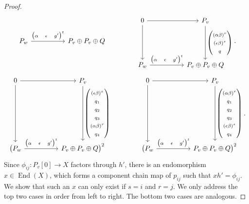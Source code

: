 \documentclass[11pt]{amsart}
\DeclareMathOperator{\End}{\mathrm{End}}
\theoremstyle{definition}
\begin{document}
\begin{proof}
\[\begin{tikzcd}[ampersand replacement=\&, column sep=50, row sep = 50]
	P_w \arrow[r, "{\begin{pmatrix} \alpha & \epsilon & g' \end{pmatrix}}^t"] \& P_v \oplus P_v \oplus Q 
	\end{tikzcd}
	\qquad  \qquad
	\begin{tikzcd}[ampersand replacement=\&, column sep=50, row sep = 50]
	0 \arrow[r, ] \arrow[d] \& P_v \arrow[d, "\begin{pmatrix} (\alpha \beta)^r \\ (\epsilon \beta)^s \\ q \end{pmatrix}"] \\
	P_w \arrow[r, "{\begin{pmatrix} \alpha & \epsilon & g' \end{pmatrix}}^t"] \& P_v \oplus P_v \oplus Q 
	\end{tikzcd}.
	\] 	
	\[ 
	\begin{tikzcd}[ampersand replacement=\&, column sep=50, row sep = 80]
	0 \arrow[r, ] \arrow[d] \& P_v \arrow[d, "\begin{pmatrix} (\epsilon \beta)^s \\ q_1 \\ q_2 \\ q_3 \\ (\alpha \beta)^r \\ q_4  \end{pmatrix}"] \\
	\big( P_w \arrow[r, "{\begin{pmatrix} \alpha & \epsilon & g' \end{pmatrix}}^t"] \& P_v \oplus P_v \oplus Q \big)^2
	\end{tikzcd}
	\qquad  \qquad
	\begin{tikzcd}[ampersand replacement=\&, column sep=50, row sep = 80]
	0 \arrow[r, ] \arrow[d] \& P_v \arrow[d, "\begin{pmatrix} (\alpha \beta)^r \\ q_1 \\ q_2 \\ q_3 \\ (\epsilon \beta)^s \\ q_4  \end{pmatrix}"] \\
	\big( P_w \arrow[r, "{\begin{pmatrix} \alpha & \epsilon & g' \end{pmatrix}}^t"] \& P_v \oplus P_v \oplus Q \big)^2
	\end{tikzcd}.
	\] 
	Since $\phi_{ij}: P_v[0] \to X$ factors through $h'$, there is an endomorphism $x \in \End(X)$, which forms a component chain map of $p_{ij}$ such that $x h' = \phi_{ij}$. We show that such an $x$ can only exist if $s=i$ and $r=j$. We only address the top two cases in order from left to right. The bottom two cases are analogous. 
	

\end{proof}
\end{document}
